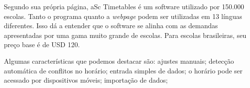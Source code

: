 \documentclass[12pt,a4paper]{article}
\begin{document}
			\par Segundo sua própria página, aSc Timetables é um software utilizado por 150.000 escolas. Tanto o programa quanto a \textit{webpage} podem ser utilizadas em 13 línguas diferentes. Isso dá a entender que o software se alinha com as demandas apresentadas por uma gama muito grande de escolas. Para escolas brasileiras, seu preço base é de USD 120.

			\par Algumas características que podemos destacar são: ajustes manuais; detecção automática de conflitos no horário; entrada simples de dados;  o horário pode ser acessado por dispositivos móveis; importação de dados;

		\begin{table}[htb]
			\begin{center}
				\begin{threeparttable}
\end{threeparttable}
\end{center}
\end{table}
\end{document}
